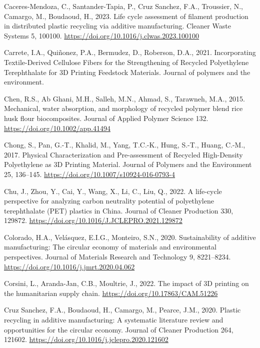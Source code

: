 \documentclass[
  12pt,
  number,
  review]{elsarticle}
\newlength{\cslhangindent}
\newlength{\cslentryspacingunit} %
\newenvironment{CSLReferences}[2] %
 {%
  \setlength{\parindent}{0pt}
  \ifodd #1
  \let\oldpar\par
  \def\par{\hangindent=\cslhangindent\oldpar}
  \fi
  \setlength{\parskip}{#2\cslentryspacingunit}
 }%
 {}
\begin{document}
\begin{CSLReferences}{1}{0}
\leavevmode{}%
Caceres-Mendoza, C., Santander-Tapia, P., Cruz Sanchez, F.A., Troussier,
N., Camargo, M., Boudaoud, H., 2023. Life cycle assessment of filament
production in distributed plastic recycling via additive manufacturing.
Cleaner Waste Systems 5, 100100.
\url{https://doi.org/10.1016/j.clwas.2023.100100}

\leavevmode{}%
Carrete, I.A., Quiñonez, P.A., Bermudez, D., Roberson, D.A., 2021.
Incorporating {Textile-Derived Cellulose Fibers} for the {Strengthening}
of {Recycled Polyethylene Terephthalate} for {3D Printing Feedstock
Materials}. Journal of polymers and the environment.

\leavevmode{}%
Chen, R.S., Ab Ghani, M.H., Salleh, M.N., Ahmad, S., Tarawneh, M.A.,
2015. Mechanical, water absorption, and morphology of recycled polymer
blend rice husk flour biocomposites. Journal of Applied Polymer Science
132. \url{https://doi.org/10.1002/app.41494}

\leavevmode{}%
Chong, S., Pan, G.-T., Khalid, M., Yang, T.C.-K., Hung, S.-T., Huang,
C.-M., 2017. Physical {Characterization} and {Pre-assessment} of
{Recycled High-Density Polyethylene} as {3D Printing Material}. Journal
of Polymers and the Environment 25, 136--145.
\url{https://doi.org/10.1007/s10924-016-0793-4}

\leavevmode{}%
Chu, J., Zhou, Y., Cai, Y., Wang, X., Li, C., Liu, Q., 2022. A
life-cycle perspective for analyzing carbon neutrality potential of
polyethylene terephthalate ({PET}) plastics in {China}. Journal of
Cleaner Production 330, 129872.
\url{https://doi.org/10.1016/J.JCLEPRO.2021.129872}

\leavevmode{}%
Colorado, H.A., Velásquez, E.I.G., Monteiro, S.N., 2020. Sustainability
of additive manufacturing: The circular economy of materials and
environmental perspectives. Journal of Materials Research and Technology
9, 8221--8234. \url{https://doi.org/10.1016/j.jmrt.2020.04.062}

\leavevmode{}%
Corsini, L., Aranda-Jan, C.B., Moultrie, J., 2022. The impact of {3D}
printing on the humanitarian supply chain.
\url{https://doi.org/10.17863/CAM.51226}

\leavevmode{}%
Cruz Sanchez, F.A., Boudaoud, H., Camargo, M., Pearce, J.M., 2020.
Plastic recycling in additive manufacturing: {A} systematic literature
review and opportunities for the circular economy. Journal of Cleaner
Production 264, 121602.
\url{https://doi.org/10.1016/j.jclepro.2020.121602}


\end{CSLReferences}
\end{document}

